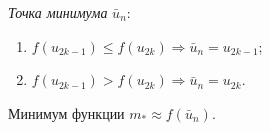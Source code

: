 \textit{Точка минимума} $\bar{u}_n$:
\begin{enumerate}[label={(\alph*)}]
	\item $f(u_{2k - 1}) \leqslant f(u_{2 k}) \Rightarrow \bar{u}_n = u_{2 k - 1}$;
	
	\item $f(u_{2 k - 1}) > f(u_{2k}) \Rightarrow \bar{u}_n = u_{2 k}$.
\end{enumerate}

Минимум функции $m_{\ast} \approx f(\bar{u}_n)$.
\newline
